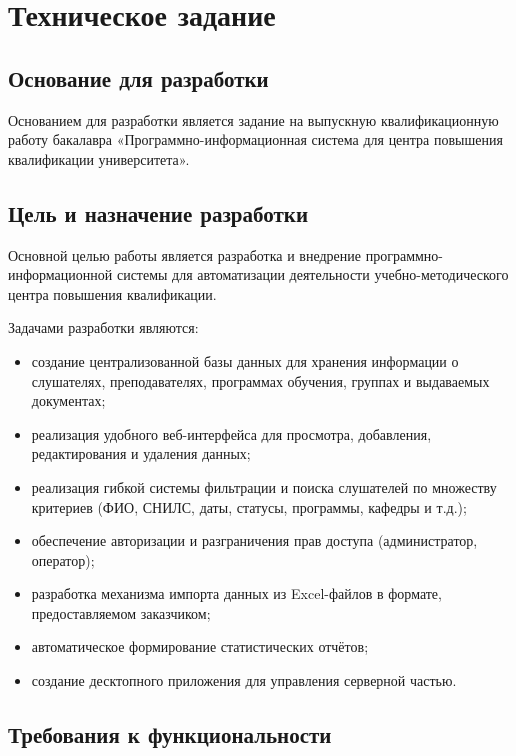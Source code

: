\section{Техническое задание}

\subsection{Основание для разработки}

Основанием для разработки является задание на выпускную квалификационную работу бакалавра «Программно-информационная система для центра повышения квалификации университета».

\subsection{Цель и назначение разработки}

Основной целью работы является разработка и внедрение программно-информационной системы для автоматизации деятельности учебно-методического центра повышения квалификации.

Задачами разработки являются:

\begin{itemize}
	\item создание централизованной базы данных для хранения информации о слушателях, преподавателях, программах обучения, группах и выдаваемых документах;
	\item реализация удобного веб-интерфейса для просмотра, добавления, редактирования и удаления данных;
	\item реализация гибкой системы фильтрации и поиска слушателей по множеству критериев (ФИО, СНИЛС, даты, статусы, программы, кафедры и т.д.);
	\item обеспечение авторизации и разграничения прав доступа (администратор, оператор);
	\item разработка механизма импорта данных из Excel-файлов в формате, предоставляемом заказчиком;
	\item автоматическое формирование статистических отчётов;
	\item создание десктопного приложения для управления серверной частью.
\end{itemize}

\subsection{Требования к функциональности}

